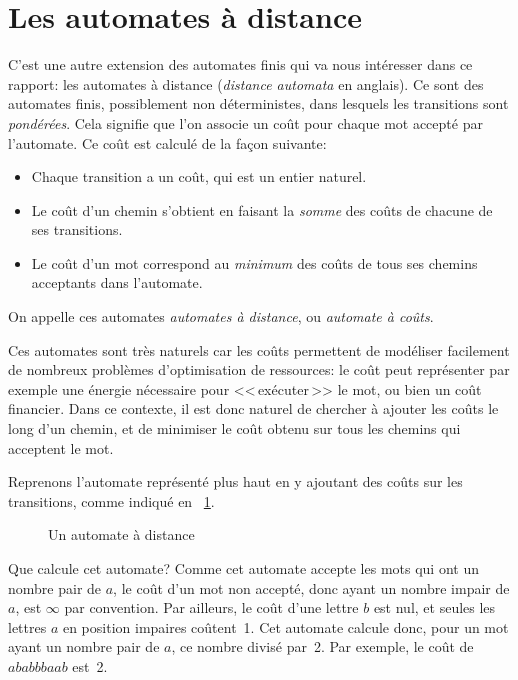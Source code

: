 \documentclass[12pt]{memoir}
\begin{document}
\section{Les automates à distance}
C'est une autre extension des automates finis qui va nous intéresser dans ce
rapport: les automates à distance (\emph{distance automata} en anglais).
Ce sont des automates finis, possiblement non déterministes, dans lesquels les transitions
sont \emph{pondérées}. Cela signifie que l'on associe un coût pour chaque mot
accepté par l'automate. Ce coût est calculé de la façon suivante:
\begin{itemize}
\item Chaque transition a un coût, qui est un entier naturel.
\item Le coût d'un
  chemin s'obtient en faisant la \emph{somme} des coûts de chacune de ses
  transitions.
\item Le coût d'un mot correspond au \emph{minimum} des coûts de tous
  ses chemins acceptants dans l'automate.
\end{itemize}
On appelle ces automates \emph{automates à distance}, ou \emph{automate à coûts}.

Ces automates sont très naturels car les coûts permettent de modéliser facilement de
nombreux problèmes d'optimisation de ressources: le coût peut représenter par
exemple une énergie nécessaire pour <<\,exécuter\,>> le mot, ou bien un coût financier. Dans ce
contexte, il est donc naturel de chercher à ajouter les coûts le long d'un
chemin, et de minimiser le coût obtenu sur tous les chemins qui acceptent le mot.

\medskip
Reprenons l'automate représenté plus haut en y ajoutant des coûts sur les
transitions, comme indiqué en \figurename~\ref{fig:1}.
\begin{figure}
  \centering
  
  \caption{Un automate à distance}
\label{fig:1}
\end{figure}
Que calcule cet automate?  Comme cet automate accepte les mots qui ont un nombre pair de $a$, le coût
d'un mot non accepté, donc ayant un nombre impair de $a$, est $\infty$ par
convention. Par ailleurs, 
le coût d'une lettre $b$ est nul, et seules les lettres $a$ en position
impaires coûtent~1. Cet automate calcule donc, pour un mot ayant un nombre
pair de $a$, ce nombre divisé par~2. Par exemple, le coût de $ababbbaab$ est~2.
\end{document}
